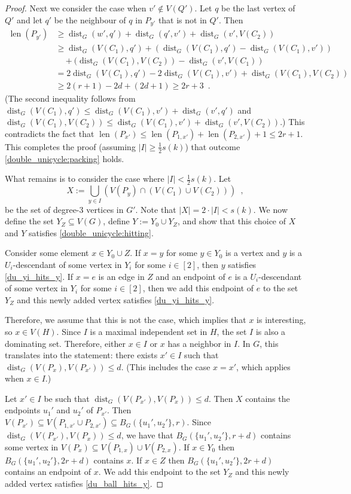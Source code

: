 \documentclass{patmorin}
\DeclareMathOperator{\len}{len}
\DeclareMathOperator{\dist}{dist}
\begin{document}
\begin{proof}
  Next we consider the case when $v'\notin V(Q')$. Let $q$ be the last vertex of $Q'$ and let $q'$ be the neighbour of $q$ in $P_{y'}$ that is not in $Q'$.  Then
  \begin{align*}
  \len(P_{y'})
    & \ge \dist_G(w',q') + \dist_G(q',v') + \dist_G(v',V(C_2)) \\
    & \ge \dist_G(V(C_1),q') + (\dist_G(V(C_1),q') - \dist_G(V(C_1),v')) \\
    & \quad {} + (\dist_G(V(C_1),V(C_2))-\dist_G(v',V(C_1)) \\
    & = 2\dist_G(V(C_1),q') - 2\dist_G(V(C_1),v') + \dist_G(V(C_1),V(C_2)) \\
    & \geq 2(r+1) - 2d + (2d+1) \geq 2r+3 \enspace .
  \end{align*}
  (The second inequality follows from $\dist_G(V(C_1),q')\leq \dist_G(V(C_1),v')+\dist_G(v',q')$ and $\dist_G(V(C_1),V(C_2))\le \dist_G(V(C_1),v')+\dist_G(v',V(C_2))$.) This contradicts the fact that $\len(P_{x'})\le \len(P_{1,x'})+\len(P_{2,x'})+1\le 2r+1$.  This completes the proof (assuming $|I|\ge\tfrac{1}{2}s(k)$) that outcome \cref{double_unicycle:packing} holds.


  What remains is to consider the case where $|I|<\frac{1}{2}s(k)$.  Let
  \[
    \textstyle X:=\bigcup_{y\in I}\left( V(P_y)\cap(V(C_1)\cup V(C_2))\right) \enspace ,
  \]
  be the set of degree-$3$ vertices in $G'$. Note that $|X| = 2\cdot|I| < s(k)$. We now define the set $Y_Z\subseteq V(G)$, define $Y:=Y_0\cup Y_Z$, and show that this choice of $X$ and $Y$ satisfies \cref{double_unicycle:hitting}.

  Consider some element $x\in Y_0\cup Z$.  If $x=y$ for some $y\in Y_0$ is a vertex and $y$ is a $U_i$-descendant of some vertex in $Y_i$ for some $i\in[2]$, then $y$ satisfies \cref{du_yi_hits_y}. If $x=e$ is an edge in $Z$ and an endpoint of $e$ is  a $U_i$-descendant of some vertex in $Y_i$ for some $i\in[2]$, then we add this endpoint of $e$ to the set $Y_Z$ and this newly added vertex satisfies \cref{du_yi_hits_y}.

  Therefore, we assume that this is not the case, which implies that $x$ is interesting, so $x\in V(H)$. Since $I$ is a maximal independent set in $H$, the set $I$ is also a dominating set. Therefore, either $x\in I$ or $x$ has a neighbor in $I$.  In $G$, this translates into the statement: there exists $x'\in I$ such that $\dist_G(V(P_x),V(P_{x'}))\le d$.
  (This includes the case $x=x'$, which applies when $x\in I$.)

  Let $x'\in I$ be such that $\dist_G(V(P_{x'}),V(P_x))\le d$.  Then $X$ contains the endpoints $u_1'$ and $u_2'$ of $P_{x'}$.  Then $V(P_{x'})\subseteq V(P_{1,x'}\cup P_{2,x'})\subseteq B_G(\{u_1',u_2'\},r)$.  Since $\dist_G(V(P_{x'}),V(P_x))\le d$, we have that $B_G(\{u_1',u_2'\},r+d)$ contains some vertex in $V(P_x)\subseteq V(P_{1,x})\cup V(P_{2,x})$. If $x\in Y_0$ then $B_G(\{u_1',u_2'\},2r+d)$ contains $x$.  If $x\in Z$  then $B_G(\{u_1',u_2'\},2r+d)$ contains an endpoint of $x$.  We add this endpoint to the set $Y_Z$ and this newly added vertex satisfies \cref{du_ball_hits_y}.


\end{proof}
\end{document}
